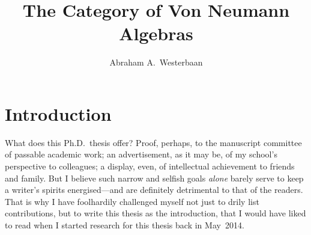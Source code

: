 \documentclass[b5paper]{book}
\begin{document}
\title{%
\sffamily\color{darkblue}%
The Category of Von Neumann Algebras}
\author{Abraham A.~Westerbaan}
\maketitle

\makeatletter{}\makeatother

\chapter{Introduction}


\begin{parsec}{10}
\begin{point}{10}
What does this Ph.D.~thesis offer?
Proof, perhaps,
to the manuscript committee
of passable academic work;
an advertisement, as it may be,
of my school's perspective
to colleagues;
a display, even,
of intellectual achievement
to friends and family.
But I believe such narrow and selfish goals \emph{alone}
barely serve to keep a writer's spirits 
energised---and are definitely detrimental to that of the readers.
That is why I have foolhardily
challenged
myself
not just 
to drily list contributions,
but to write this thesis 
as the introduction,
that I would have liked to read
when I started
research for this thesis
back in May~2014.


\end{point}
\end{parsec}
\end{document}

